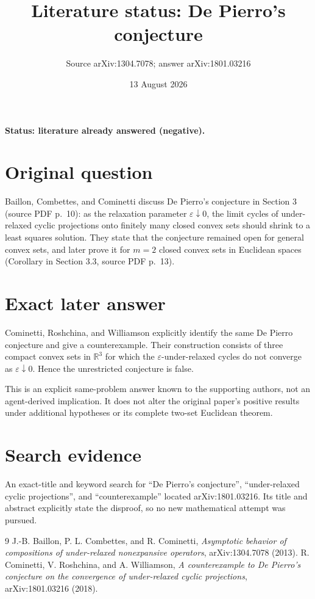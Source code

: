 \documentclass[11pt]{article}
\title{Literature status: De Pierro's conjecture}
\author{Source arXiv:1304.7078; answer arXiv:1801.03216}
\date{13 August 2026}
\begin{document}
\maketitle
\noindent\textbf{Status: literature already answered (negative).}

\section*{Original question}
Baillon, Combettes, and Cominetti \cite{BCC} discuss De Pierro's conjecture
in Section 3 (source PDF p.~10): as the relaxation parameter
$\varepsilon\downarrow0$, the limit cycles of under-relaxed cyclic
projections onto finitely many closed convex sets should shrink to a least
squares solution.  They state that the conjecture remained open for general
convex sets, and later prove it for $m=2$ closed convex sets in Euclidean
spaces (Corollary in Section 3.3, source PDF p.~13).

\section*{Exact later answer}
Cominetti, Roshchina, and Williamson \cite{CRW} explicitly identify the same
De Pierro conjecture and give a counterexample.  Their construction consists
of three compact convex sets in $\mathbb R^3$ for which the
$\varepsilon$-under-relaxed cycles do not converge as
$\varepsilon\downarrow0$.  Hence the unrestricted conjecture is false.

This is an explicit same-problem answer known to the supporting authors, not
an agent-derived implication.  It does not alter the original paper's
positive results under additional hypotheses or its complete two-set
Euclidean theorem.

\section*{Search evidence}
An exact-title and keyword search for ``De Pierro's conjecture'',
``under-relaxed cyclic projections'', and ``counterexample'' located
arXiv:1801.03216.  Its title and abstract explicitly state the disproof, so no
new mathematical attempt was pursued.

\begin{thebibliography}{9}
 J.-B. Baillon, P. L. Combettes, and R. Cominetti,
\emph{Asymptotic behavior of compositions of under-relaxed nonexpansive
operators}, arXiv:1304.7078 (2013).
 R. Cominetti, V. Roshchina, and A. Williamson,
\emph{A counterexample to De Pierro's conjecture on the convergence of
under-relaxed cyclic projections}, arXiv:1801.03216 (2018).
\end{thebibliography}
\end{document}

